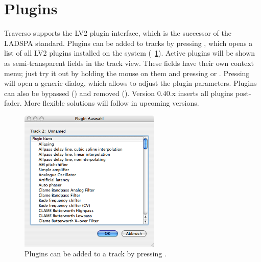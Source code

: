 \section{Plugins}
Traverso supports the LV2 plugin interface, which is the successor of the LADSPA standard. Plugins can be added to tracks by pressing , which opens a list of all LV2 plugins installed on the system (\FigB~\ref{fig_pluglist}). Active plugins will be shown as semi-transparent fields in the track view. These fields have their own context menu; just try it out by holding the mouse on them and pressing  or . Pressing  will open a generic dialog, which allows to adjust the plugin parameters. Plugins can also be bypassed () and removed (). Version 0.40.x inserts all plugins post-fader. More flexible solutions will follow in upcoming versions.

\begin{figure}[t]
 \centering\includegraphics[width=0.6\textwidth]{images/plugin-list}
 \caption{Plugins can be added to a track by pressing .}
 \label{fig_pluglist}
\end{figure}


